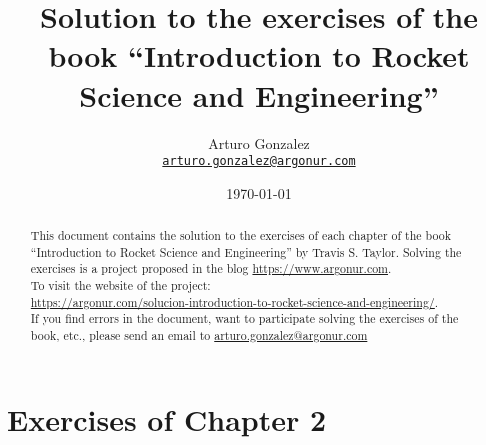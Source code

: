 \documentclass{article}
\begin{document}
\title{Solution to the exercises of the book ``Introduction to Rocket Science and Engineering''}
\author{Arturo Gonzalez\\
	\texttt{\href{mailto:arturo.gonzalez@argonur.com}{arturo.gonzalez@argonur.com}}}
\date{\today}
\maketitle

\begin{abstract}
This document contains the solution to the exercises of each chapter of the book ``Introduction to Rocket Science and Engineering'' by Travis S. Taylor. Solving the exercises is a project proposed in the blog \url{https://www.argonur.com}.\\

To visit the website of the project: \\
\url{https://argonur.com/solucion-introduction-to-rocket-science-and-engineering/}.\\

If you find errors in the document, want to participate solving the exercises of the book, etc., please send an email to \href{mailto:arturo.gonzalez@argonur.com}{arturo.gonzalez@argonur.com}
\end{abstract}

\cleardoublepage




\cleardoublepage

%

\section{Exercises of Chapter 2}
\end{document}
